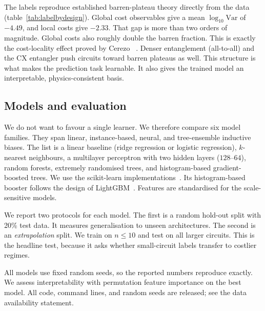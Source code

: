 \documentclass[12pt]{iopart}
\newcommand{\ExtrapCut}{10}
\begin{document}
The labels reproduce established barren-plateau theory directly from the data
(table~\ref{tab:labelbydesign}). Global cost observables give a mean
$\log_{10}\mathrm{Var}$ of $-4.49$, and local costs give $-2.33$. That gap is
more than two orders of magnitude. Global costs also roughly double the barren
fraction. This is exactly the cost-locality effect proved by Cerezo
\etal~\cite{cerezo2021cost}. Denser entanglement (all-to-all) and the CX
entangler push circuits toward barren plateaus as well. This structure is what
makes the prediction task learnable. It also gives the trained model an
interpretable, physics-consistent basis.

\begin{table}[t]
\caption{Trainability broken down by design choice. Lower mean
$\log_{10}\mathrm{Var}$ and higher barren \% indicate less trainable families.
The data recovers known barren-plateau drivers.}
\label{tab:labelbydesign}
\centering

\end{table}

\subsection{Models and evaluation}
We do not want to favour a single learner. We therefore compare six model
families. They span linear, instance-based, neural, and tree-ensemble inductive
biases. The list is a linear baseline (ridge regression or logistic regression),
$k$-nearest neighbours, a multilayer perceptron with two hidden layers
($128$--$64$), random forests, extremely randomised trees, and histogram-based
gradient-boosted trees. We use the scikit-learn
implementations~\cite{pedregosa2011scikit}. Its histogram-based booster follows
the design of LightGBM~\cite{ke2017lightgbm}. Features are standardised for the
scale-sensitive models.

We report two protocols for each model. The first is a random hold-out split with
20\% test data. It measures generalisation to unseen architectures. The second is
an \emph{extrapolation} split. We train on $n\le\ExtrapCut{}$ and test on all
larger circuits. This is the headline test, because it asks whether
small-circuit labels transfer to costlier regimes.

All models use fixed random seeds, so the reported numbers reproduce exactly. We
assess interpretability with permutation feature importance on the best model.
All code, command lines, and random seeds are released; see the data availability
statement.
\end{document}
